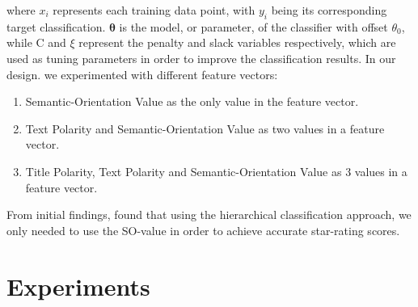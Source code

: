 \documentclass[11pt]{report} %
\begin{document}
	where $x_{i}$ represents each training data point, with $y_{i}$ being its corresponding target classification. $\mathbf{\theta}$ is the model, or parameter, of the classifier with offset $\theta_{0}$, while C and $\xi$ represent the penalty and slack variables respectively, which are used as tuning parameters in order to improve the classification results. In our design. we experimented with different feature vectors:

\begin{enumerate}
\item{Semantic-Orientation Value as the only value in the feature vector.}
\item {Text Polarity and Semantic-Orientation Value as two values in a feature vector.}
\item {Title Polarity, Text Polarity and Semantic-Orientation Value as 3 values in a feature vector.}
\end{enumerate}

From initial findings, found that using the hierarchical classification approach, we only needed to use the SO-value in order to achieve accurate star-rating scores. 

\chapter{Experiments}
\end{document}
